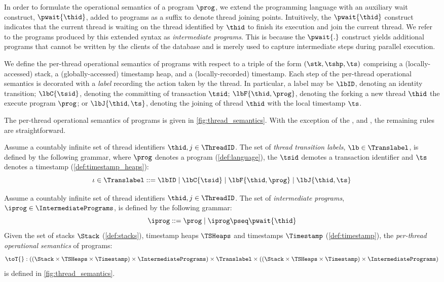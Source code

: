 In order to formulate the operational semantics of a program $\prog$, we extend the programming language with an auxiliary wait construct, \(\pwait{\thid} \), added to programs as a suffix to denote thread joining points.
Intuitively, the \( \pwait{\thid} \) construct indicates that the current thread is waiting on the thread identified by \( \thid \) to finish its execution and join the current thread. We refer to the programs produced by this extended syntax as \emph{intermediate programs}. This is because the $\pwait{.}$ construct yields additional programs that cannot be written by the clients of the database and is merely used to capture intermediate steps during parallel execution. 
%

We define the per-thread operational semantics of programs with respect to a triple of the form $(\stk, \tshp, \ts)$ comprising a (locally-accessed) stack, a (globally-accessed) timestamp heap, and a (locally-recorded) timestamp. 
Each step of the per-thread operational semantics is decorated with a \emph{label} recording the action taken by the thread. In particular, a label may be $\lbID$, denoting an identity transition; $\lbC{\tsid}$, denoting the committing of transaction $\tsid$; $\lbF{\thid, \prog}$, denoting the forking a new thread $\thid$ the execute program $\prog$; or $\lbJ{\thid, \ts}$, denoting the joining of thread $\thid$ with the local timestamp $\ts$.
  
The per-thread operational semantics of programs is given in \fig\ref{fig:thread_semantics}.
With the exception of the ,  and , the remaining rules are straightforward.

\begin{defn}
\label{def:label}
Assume a countably infinite set of thread identifiers $\thid,j \in \ThreadID$.
The set of \emph{thread transition labels}, $\lb \in \Translabel$, is defined by the following grammar, where $\prog$ denotes a program (\ref{def:language}), the $\tsid$ demotes a transaction identifier and $\ts$ denotes a timestamp (\ref{def:timestamp_heaps}):
\[
	\iota \in \Translabel ::= \lbID \mid \lbC{\tsid} \mid \lbF{\thid,\prog} \mid \lbJ{\thid,\ts}
\]
\end{defn}


\begin{defn}
\label{def:thread_semantics}
Assume a countably infinite set of thread identifiers $\thid,j \in \ThreadID$.
The set of \emph{intermediate programs}, $\iprog \in \IntermediatePrograms$, is defined by the following grammar:
%
\[
    \iprog ::= \prog \mid \iprog \pseq \pwait{\thid}
\]
%
Given the set of stacks $\Stack$ (\ref{def:stacks}), timestamp heaps $\TSHeaps$ and timestamps $\Timestamp$ (\ref{def:timestamp}), the \emph{per-thread operational semantics} of programs:
%
\[
	\toT{} : 
	\left((\Stack \times \TSHeaps \times \Timestamp) \times \IntermediatePrograms \right) 
	\times \Translabel \times  
	\left((\Stack \times \TSHeaps \times \Timestamp) \times \IntermediatePrograms \right) 
\]
%
is defined in \fig\ref{fig:thread_semantics}.
\end{defn}

